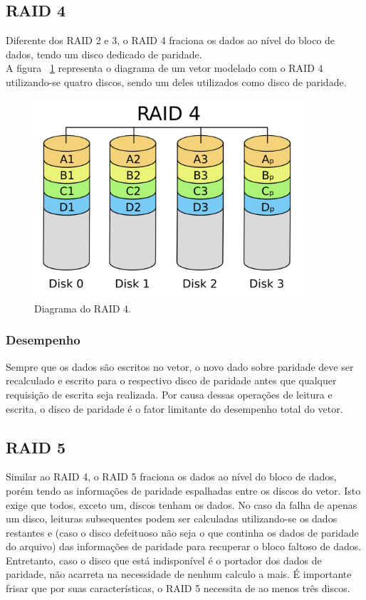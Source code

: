 		\subsection{RAID 4}
		Diferente dos RAID 2 e 3, o RAID 4 fraciona os dados ao nível do bloco de dados, tendo um disco dedicado de paridade. \\
		
		A figura ~\ref{fig:raid4} representa o diagrama de um vetor modelado com o RAID 4 utilizando-se quatro discos, sendo um deles utilizados como disco de paridade.\\
		
		\begin{figure}[htb]
			\begin{center}
				
				\includegraphics[clip,width=10.0cm]{images/RAID_4.png}
				\caption{Diagrama do RAID 4. }
				\label{fig:raid4}
			\end{center}
		\end{figure} 
		
		\subsubsection{Desempenho}
		Sempre que os dados são escritos no vetor, o novo dado sobre paridade deve ser recalculado e escrito para o respectivo disco de paridade antes que qualquer requisição de escrita seja realizada. Por causa dessas operações de leitura e escrita, o disco de paridade é o fator limitante do desempenho total do vetor.\\
		
		\subsection{RAID 5}
		Similar ao RAID 4, o RAID 5 fraciona os dados ao nível do bloco de dados, porém tendo as informações de paridade espalhadas entre os discos do vetor. Isto exige que todos, exceto um, discos tenham os dados. No caso da falha de apenas um disco, leituras subsequentes podem ser calculadas utilizando-se os dados restantes e (caso o disco defeituoso não seja o que continha os dados de paridade do arquivo) das informações de paridade para recuperar o bloco faltoso de dados. Entretanto, caso o disco que está indisponível é o portador dos dados de paridade, não acarreta na necessidade de nenhum calculo a mais. É importante frisar que por suas características, o RAID 5 necessita de ao menos três discos.  \\
		

